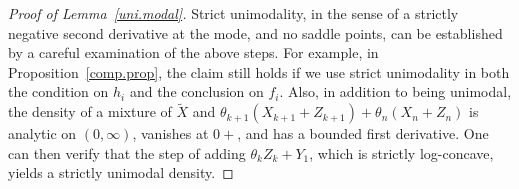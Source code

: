 \documentclass[11pt]{article}
\begin{document}
\begin{proof}[Proof of Lemma~\ref{uni.modal}]

Strict unimodality, in the sense of a strictly negative second derivative at the mode, and no saddle points, can be established by a careful examination of the above steps.  For example, in Proposition~\ref{comp.prop}, the claim still holds if we use strict unimodality in both the condition on $h_i$ and the conclusion on $f_i$.  Also, in addition to being unimodal, the density of a mixture of $\tilde{X}$ and $ \theta_{k+1} (X_{k+1}+Z_{k+1}) + \theta_n (X_n + Z_n)$ is analytic on $(0, \infty)$, vanishes at $0+$, and has a bounded first derivative.  One can then verify that the step of adding $\theta_k Z_k +Y_1$, which is strictly log-concave, yields a strictly unimodal density. 
\end{proof}
\end{document}
